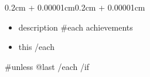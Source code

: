 \documentclass[10pt, letterpaper]{article}
\newenvironment{highlights}{
    \begin{itemize}[
        topsep=0.10cm,
        parsep=0.10cm,
        partopsep=0pt,
        itemsep=0pt,
        leftmargin=0.4cm + 10pt
    ]
}{
    \end{itemize}
}
\newenvironment{onecolentry}{
    \begin{adjustwidth}{0.2cm + 0.00001cm}{0.2cm + 0.00001cm}
}{
    \end{adjustwidth}
}
\begin{document}
    \vspace{0.10cm}
    \begin{onecolentry}
        \begin{highlights}
            \item {{description}}
            {{#each achievements}}
            \item {{this}}
            {{/each}}
        \end{highlights}
    \end{onecolentry}
    {{#unless @last}}
    {{/each}}
    {{/if}}

\end{document}

